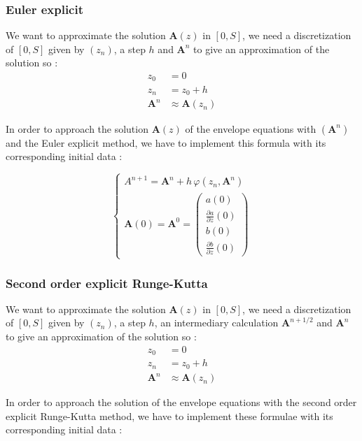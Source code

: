 \documentclass[10pt]{article}
\newcommand{\D}{{\partial}}
\begin{document}
\subsubsection{Euler explicit}


We want to approximate the solution $\mathbf{A}(z)$ in $[0, S]$, we need a discretization of $[0, S]$ given by $(z_n)$, a step $h$ and $\mathbf{A}^n$ to give an approximation of the solution so :
\begin{align*}
z_0 &= 0 \\
z_n &= z_0 + h \\
\mathbf{A}^n &\approx \mathbf{A}(z_n)
\end{align*}

In order to approach the solution $\mathbf{A}(z)$ of the envelope equations with $(\mathbf{A}^n)$ and the Euler explicit method, we have to implement this formula with its corresponding initial data :

$$\left\lbrace \begin{array}{l}
{A}^{n+1} = \mathbf{A}^{n} + h\,\varphi\left(z_n,\mathbf{A}^n\right) \\
\mathbf{A}(0) = \mathbf{A}^{0} = \left(\begin{array}{c}
a(0) \\ \frac{\D a}{\D z}(0) \\ b(0) \\ \frac{\D b}{\D z}(0)
\end{array}\right)
\end{array} \right.$$


\subsubsection{Second order explicit Runge-Kutta}


We want to approximate the solution $\mathbf{A}(z)$ in $[0, S]$, we need a discretization of $[0, S]$ given by $(z_n)$, a step $h$, an intermediary calculation $\mathbf{A}^{n+1/2}$ and $\mathbf{A}^n$ to give an approximation of the solution so :
\begin{align*}
z_0 &= 0 \\
z_n &= z_0 + h \\
\mathbf{A}^n &\approx \mathbf{A}(z_n)
\end{align*}

In order to approach the solution of the envelope equations with the second order explicit Runge-Kutta method, we have to implement these formulae with its corresponding initial data :
\end{document}
